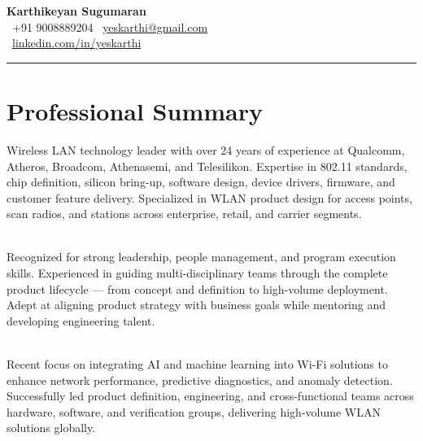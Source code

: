 \documentclass[a4paper,11pt]{article}
\newcommand{\contactinfo}[3]{\faPhone~#1 \quad \faEnvelope~\href{mailto:#2}{#2} \quad \faMapMarker*~#3}
\begin{document}
\begin{center}
    {\Huge \textbf{Karthikeyan Sugumaran}} \\
    \vspace{5pt}
    \contactinfo{+91 9008889204}{yeskarthi@gmail.com}{} \\
    \faLinkedin\ \href{https://www.linkedin.com/in/yeskarthi/}{linkedin.com/in/yeskarthi} \\
    \vspace{10pt}
\end{center}

\noindent\rule{\textwidth}{0.4pt}
\vspace{10pt}

\section*{Professional Summary}
\begin{flushleft}
    Wireless LAN technology leader with over 24 years of experience at Qualcomm, Atheros, Broadcom, Athenasemi, and Telesilikon. Expertise in 802.11 standards, chip definition, silicon bring-up, software design, device drivers, firmware, and customer feature delivery. Specialized in WLAN product design for access points, scan radios, and stations across enterprise, retail, and carrier segments. 

    \mbox{} \\

    Recognized for strong leadership, people management, and program execution skills. Experienced in guiding multi-disciplinary teams through the complete product lifecycle --- from concept and definition to high-volume deployment. Adept at aligning product strategy with business goals while mentoring and developing engineering talent.

    \mbox{} \\

    Recent focus on integrating AI and machine learning into Wi-Fi solutions to enhance network performance, predictive diagnostics, and anomaly detection. Successfully led product definition, engineering, and cross-functional teams across hardware, software, and verification groups, delivering high-volume WLAN solutions globally.
\end{flushleft}



\end{document}
